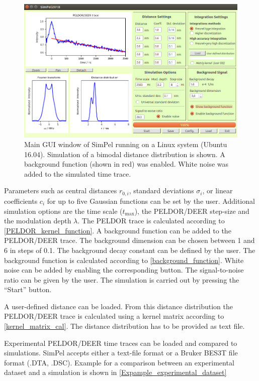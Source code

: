 \documentclass[pdftex,bezier,german,a4,twoside, headexclude,12pt,nochapterprefix, titlepage]{extarticle}
\newcommand{\simpel}{\textsf{SimPel}}
\begin{document}
\begin{figure}[h!]
\begin{center}
\includegraphics[scale=0.5]{Main_Window_example.png}
\caption{Main GUI window of \simpel{} running on a Linux system (Ubuntu 16.04). Simulation of a bimodal distance distribution is shown. A background
function (shown in red) was enabled. White noise was added to the simulated time trace.}
\label{MainWindowfig}
\end{center}
\end{figure}

Parameters such as central distances $r_{0,i}$, standard deviations $\sigma_i$, or linear coefficients $c_i$ for up to five Gaussian functions can be set by the user. Additional simulation options are the time scale ($t_{\mathrm{max}}$), the 
PELDOR/DEER step-size and the modulation depth $\lambda$. The PELDOR trace is calculated according to  \autoref{PELDOR_kernel_function}. A background function can be added to the PELDOR/DEER trace. The background dimension can be chosen between 1 and 6 in steps of 0.1. The background decay constant can be defined by the user. The background function is calculated according to \autoref{background_function}. White noise can be added by enabling the corresponding button. The signal-to-noise ratio can be given by the user.
The simulation is carried out by pressing the ``Start'' button. 

A user-defined distance can be loaded. From this distance distribution the PELDOR/DEER trace is calculated using a kernel matrix according to \autoref{kernel_matrix_cal}. The distance distribution has to be provided as text file.

Experimental PELDOR/DEER time traces can be loaded and compared to simulations. \simpel{} accepts either a text-file format or a Bruker BES3T file format (.DTA, .DSC). Example for a comparison between an experimental dataset and a simulation is shown in \autoref{Expample_experimental_dataset}
\end{document}
